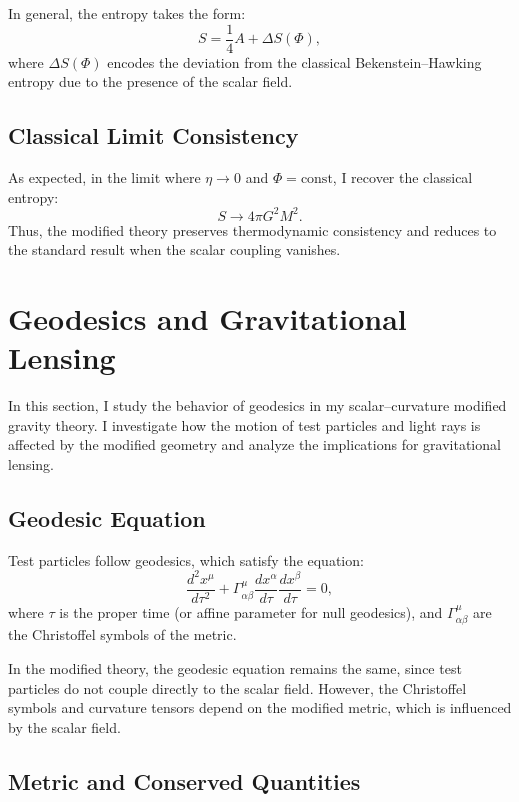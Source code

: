 \documentclass[12pt]{article}
\begin{document}
In general, the entropy takes the form:
\begin{equation}
S = \frac{1}{4} A + \Delta S(\Phi),
\end{equation}
where \( \Delta S(\Phi) \) encodes the deviation from the classical Bekenstein–Hawking entropy due to the presence of the scalar field.

\subsection{Classical Limit Consistency}

As expected, in the limit where \( \eta \to 0 \) and \( \Phi = \text{const} \), I recover the classical entropy:
\begin{equation}
S \to 4\pi G^2 M^2.
\end{equation}
Thus, the modified theory preserves thermodynamic consistency and reduces to the standard result when the scalar coupling vanishes.

\section{Geodesics and Gravitational Lensing}

In this section, I study the behavior of geodesics in my scalar--curvature modified gravity theory. I investigate how the motion of test particles and light rays is affected by the modified geometry and analyze the implications for gravitational lensing.

\subsection{Geodesic Equation}

Test particles follow geodesics, which satisfy the equation:
\begin{equation}
\frac{d^2 x^\mu}{d\tau^2} + \Gamma^\mu_{\alpha\beta} \frac{dx^\alpha}{d\tau} \frac{dx^\beta}{d\tau} = 0,
\label{eq:geodesic}
\end{equation}
where \( \tau \) is the proper time (or affine parameter for null geodesics), and \( \Gamma^\mu_{\alpha\beta} \) are the Christoffel symbols of the metric.

In the modified theory, the geodesic equation remains the same, since test particles do not couple directly to the scalar field. However, the Christoffel symbols and curvature tensors depend on the modified metric, which is influenced by the scalar field.

\subsection{Metric and Conserved Quantities}
\end{document}
